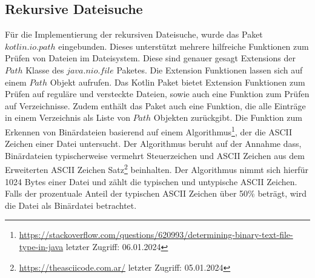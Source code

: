 \documentclass{article}
\begin{document}
\subsection{Rekursive Dateisuche}
Für die Implementierung der rekursiven Dateisuche, wurde das Paket $kotlin.io.path$ eingebunden. Dieses unterstützt mehrere hilfreiche Funktionen zum Prüfen von Dateien im Dateisystem. Diese sind genauer gesagt Extensions der $Path$ Klasse des $java.nio.file$ Paketes. Die Extension Funktionen lassen sich auf einem $Path$ Objekt aufrufen. Das Kotlin Paket bietet Extension Funktionen zum Prüfen auf reguläre und versteckte Dateien, sowie auch eine Funktion zum Prüfen auf Verzeichnisse. Zudem enthält das Paket auch eine Funktion, die alle Einträge in einem Verzeichnis als Liste von $Path$ Objekten zurückgibt. \newline
Die Funktion zum Erkennen von Binärdateien basierend auf einem Algorithmus\footnote{\url{https://stackoverflow.com/questions/620993/determining-binary-text-file-type-in-java} letzter Zugriff: 06.01.2024}, der die ASCII Zeichen einer Datei untersucht. Der Algorithmus beruht auf der Annahme dass, Binärdateien typischerweise vermehrt Steuerzeichen und ASCII Zeichen aus dem Erweiterten ASCII Zeichen Satz\footnote{\url{https://theasciicode.com.ar/} letzter Zugriff: 05.01.2024} beinhalten. Der Algorithmus nimmt sich hierfür 1024 Bytes einer Datei und zählt die typischen und untypische ASCII Zeichen. Falls der prozentuale Anteil der typischen ASCII Zeichen über 50\% beträgt, wird die Datei als Binärdatei betrachtet.
\end{document}
